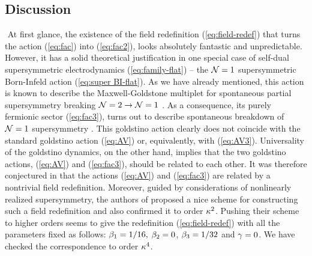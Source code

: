 \subsection{Discussion}
${}$\newline
\indent At first glance, the existence of the field redefinition (\ref{eq:field-redef}) that turns the action (\ref{eq:fac}) into (\ref{eq:fac2}), looks absolutely fantastic and unpredictable. However, it has a solid theoretical justification in one special case of self-dual supersymmetric electrodynamics (\ref{eq:family-flat}) -- the ${\cal N} =1$ supersymmetric Born-Infeld action (\ref{eq:super BI-flat}). As we have already mentioned, this action is known to describe the Maxwell-Goldstone multiplet for spontaneous partial supersymmetry breaking ${\cal N}=2 \to {\cal N}=1$ \cite{Bagger:1996wp,Rocek:1997hi}. As a consequence, its purely fermionic sector (\ref{eq:fac3}), turns out to describe spontaneous breakdown of ${\cal N}=1$ supersymmetry \cite{Hatanaka:2003cr}. This goldstino action clearly does not coincide with the standard goldstino action (\ref{eq:AV}) or, equivalently, with (\ref{eq:AV3}). Universality of the goldstino dynamics, on the other hand, implies that the two goldstino actions, (\ref{eq:AV}) and (\ref{eq:fac3}), should be related to each other. It was therefore conjectured in \cite{Hatanaka:2003cr} that the actions (\ref{eq:AV}) and (\ref{eq:fac3}) are related by a nontrivial field redefinition. Moreover, guided by considerations of nonlinearly realized supersymmetry, the authors of \cite{Hatanaka:2003cr} proposed a nice scheme for constructing such a field redefinition and also confirmed it to order $\kappa^2$. Pushing their scheme to higher orders seems to give the redefinition (\ref{eq:field-redef}) with all the parameters fixed as follows: $\beta_{1} =1/16,$ $\beta_{2} = 0$, $\beta_{3} = 1/32$ and $\gamma = 0$. We have checked the correspondence to order $\kappa^4$.

